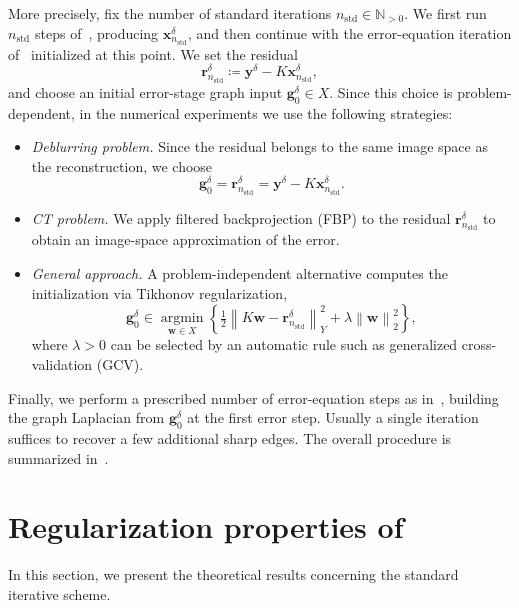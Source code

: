 \documentclass{article}
\theoremstyle{remark}
\newcommand{\norm}[1]{\left\lVert #1 \right\rVert}
\newcommand{\bx}{{\bm{x}}}
\newcommand{\by}{{\bm{y}}}
\newcommand{\bw}{{\bm{w}}}
\newcommand{\br}{{\bm{r}}}
\newcommand{\bg}{{\bm{g}}}
\begin{document}
More precisely, fix the number of standard iterations
$n_{\mathrm{std}}\in\mathbb{N}_{>0}$. We first run $n_{\mathrm{std}}$ steps
of~, producing $\bx_{n_{\mathrm{std}}}^\delta$, and then
continue with the error-equation iteration of~ initialized at
this point. We set the residual
\[
\br_{n_{\mathrm{std}}}^\delta\coloneqq\by^\delta-K\bx_{n_{\mathrm{std}}}^\delta ,
\]
and choose an initial error-stage graph input $\bg_0^\delta\in X$.
Since this choice is problem-dependent, in the numerical experiments we use the
following strategies:
\begin{itemize}
    \item \emph{Deblurring problem.} Since the residual belongs to the same image
    space as the reconstruction, we choose
    \begin{equation}\label{eq:g0res}
    \bg_0^\delta=\br_{n_{\mathrm{std}}}^\delta
    =\by^\delta-K\bx_{n_{\mathrm{std}}}^\delta .
    \end{equation}
    \item \emph{CT problem.} We apply filtered backprojection (FBP) to the
    residual $\br_{n_{\mathrm{std}}}^\delta$ to obtain an image-space approximation
    of the error.
    \item \emph{General approach.} A problem-independent alternative computes the
    initialization via Tikhonov regularization,
    \[
    \bg_0^\delta \in
    \underset{\bw \in X}{\operatorname{argmin}}
    \left\{
    \tfrac{1}{2}\norm{K\bw-\br_{n_{\mathrm{std}}}^\delta}_Y^2
    + \lambda \norm{\bw}_2^2
    \right\},
    \]
    where $\lambda>0$ can be selected by an automatic rule such as generalized
    cross-validation (GCV).
\end{itemize}
Finally, we perform a prescribed number of error-equation steps as
in~, building the graph Laplacian from
$\bg_0^\delta$ at the first error step. Usually a single iteration
suffices to recover a few additional sharp edges. The overall procedure is summarized in~.




\section{Regularization properties of \texorpdfstring{}{the standard iterative scheme}}\label{sec:convergence_standard}
In this section, we present the theoretical results concerning the standard iterative scheme.
\end{document}

